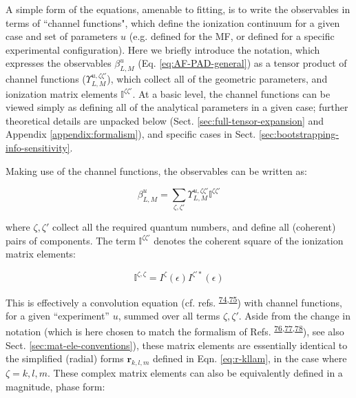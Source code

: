 \documentclass[10pt]{article}
\begin{document}
A simple form of the equations, amenable to fitting, is to write the observables in terms of ``channel functions", which define the ionization continuum for a given case and set of parameters $u$ (e.g. defined for the MF, or defined for a specific experimental configuration). Here we briefly introduce the notation, which expresses the observables $\beta_{L,M}^{u}$ (Eq. \ref{eq:AF-PAD-general}) as a tensor product of channel functions ($\varUpsilon_{L,M}^{u,\zeta\zeta'}$), which collect all of the geometric parameters, and ionization matrix elements $\mathbb{I}^{\zeta\zeta'}$. At a basic level, the channel functions can be viewed simply as defining all of the analytical parameters in a given case; further theoretical details are unpacked below (Sect. \ref{sec:full-tensor-expansion} and Appendix \ref{appendix:formalism}), and specific cases in Sect. \ref{sec:bootstrapping-info-sensitivity}.

Making use of the channel functions, the observables can be written as:

\begin{equation}
\beta_{L,M}^{u}=\sum_{\zeta,\zeta'}\varUpsilon_{L,M}^{u,\zeta\zeta'}\mathbb{I}^{\zeta\zeta'}\label{eqn:channel-fns}
\end{equation}


where $\zeta,\zeta'$ collect all the required quantum numbers, and define all (coherent) pairs of components. The term $\mathbb{I}^{\zeta\zeta'}$ denotes the coherent square of the ionization matrix elements:

\begin{equation}
\mathbb{I}^{\zeta,\zeta}=I^{\zeta}(\epsilon)I^{\zeta'*}(\epsilon)
\label{eqn:I-zeta}
\end{equation}

This is effectively a convolution equation (cf. refs. \textsuperscript{\hyperref[csl:74]{74},\hyperref[csl:75]{75}}) with channel functions, for a given ``experiment'' $u$, summed over all terms $\zeta,\zeta'$. Aside from the change in notation (which is here chosen to match the formalism of Refs. \textsuperscript{\hyperref[csl:76]{76},\hyperref[csl:77]{77},\hyperref[csl:78]{78}}), see also Sect. \ref{sec:mat-ele-conventions}), these matrix elements are essentially identical to the simplified (radial) forms $\mathbf{r}_{k,l,m}$ defined in Eqn. \ref{eq:r-kllam}, in the case where $\zeta=k,l,m$. These complex matrix elements can also be equivalently defined in a magnitude, phase form:
\end{document}
